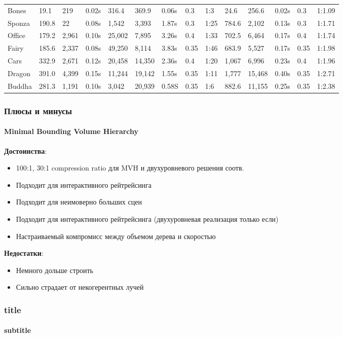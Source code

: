 \documentclass{beamer}
\begin{document}
\begin{frame}[t]
{\begin{tabular}{l||l l l||l l l l l||l l l l l}
            \hline
            Bones & 19.1 & 219 & 0.02s & 316.4 & 369.9 & 0.06s & 0.3 & 1:3 & 24.6 & 256.6 & 0.02s & 0.3 & 1:1.09 \\
            Sponza & 190.8 & 22 & 0.08s & 1,542 & 3,393 & 1.87s & 0.3 & 1:25 & 784.6 & 2,102 & 0.13s & 0.3 & 1:1.71 \\
            Office & 179.2 & 2,961 & 0.10s & 25,002 & 7,895 & 3.26s & 0.4 & 1:33 & 702.5 & 6,464 & 0.17s & 0.4 & 1:1.74 \\
            Fairy & 185.6 & 2,337 & 0.08s & 49,250 & 8,114 & 3.83s & 0.35 & 1:46 & 683.9 & 5,527 & 0.17s & 0.35 & 1:1.98 \\
            Cars & 332.9 & 2,671 & 0.12s & 20,458 & 14,350 & 2.36s & 0.4 & 1:20 & 1,067 & 6,996 & 0.23s & 0.4 & 1:1.96 \\
            Dragon & 391.0 & 4,399 & 0.15s & 11,244 & 19,142 & 1.55s & 0.35 & 1:11 & 1,777 & 15,468 & 0.40s & 0.35 & 1:2.71 \\
            Buddha & 281.3 & 1,191 & 0.10s & 3,042 & 20,939 & 0.58S & 0.35 & 1:6 & 882.6 & 11,155 & 0.25s & 0.35 & 1:2.38 \\
            \hline
    \end{tabular} }
\end{frame}

\begin{frame}[t]
    \frametitle{Плюсы и минусы}
    \framesubtitle{Minimal Bounding Volume Hierarchy}

    \textbf{Достоинства}:
    \begin{itemize}
        \item
            100:1, 30:1 compression ratio для MVH и двухуровневого решения соотв.
        \item
            Подходит для интерактивного рейтрейсинга
        \item
            Подходит для неимоверно больших сцен
        \item
            Подходит для интерактивного рейтрейсинга (двухуровневая реализация только если)
        \item
            Настраиваемый компромисс между объемом дерева и скоростью
    \end{itemize}

    \textbf{Недостатки}:
    \begin{itemize}
        \item
            Немного дольше строить
        \item
            Сильно страдает от некогерентных лучей
    \end{itemize}

\end{frame}

\begin{frame}[t]
    \frametitle{title}
    \framesubtitle{subtitle}

\end{frame}
\end{document}
